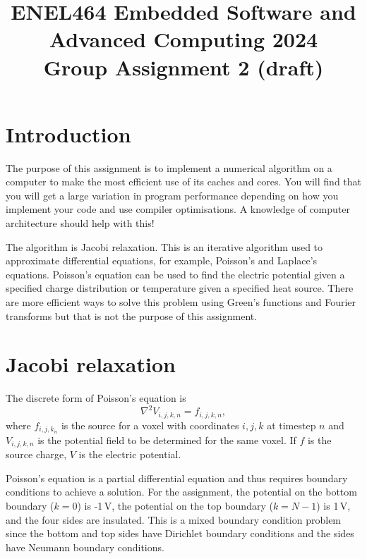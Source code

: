 \documentclass[a4paper,11pt]{article}
\begin{document}
\title{\bf ENEL464 Embedded Software and Advanced Computing 2024 \\ Group Assignment 2 (draft)}
\author{}
\date{}
\maketitle


\section{Introduction}

The purpose of this assignment is to implement a numerical algorithm
on a computer to make the most efficient use of its caches and cores.
You will find that you will get a large variation in program
performance depending on how you implement your code and use compiler
optimisations.  A knowledge of computer architecture should help with
this!

The algorithm is Jacobi relaxation.  This is an iterative algorithm
used to approximate differential equations, for example, Poisson's and
Laplace's equations.  Poisson's equation can be used to find the
electric potential given a specified charge distribution or
temperature given a specified heat source.  There are more efficient
ways to solve this problem using Green's functions and Fourier
transforms but that is not the purpose of this assignment.

\section{Jacobi relaxation}

The discrete form of Poisson's equation is
%
\begin{equation}
  \nabla^2 V_{i,j,k,n} = f_{i,j,k,n},
\end{equation}
%
where $f_{i,j,k_n}$ is the source for a voxel with coordinates $i,j,k$
at timestep $n$ and $V_{i,j,k,n}$ is the potential field to be
determined for the same voxel.  If $f$ is the source charge, $V$ is
the electric potential.

Poisson's equation is a partial differential equation and thus
requires boundary conditions to achieve a solution.  For the
assignment, the potential on the bottom boundary ($k=0$) is -1\,V, the
potential on the top boundary ($k=N-1$) is 1\,V, and the four sides
are insulated.  This is a mixed boundary condition problem since the
bottom and top sides have Dirichlet boundary conditions and the sides
have Neumann boundary conditions.
\end{document}
